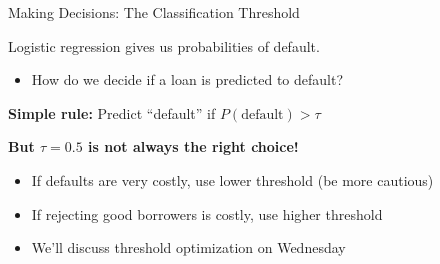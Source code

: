 \documentclass[10pt]{beamer}
\begin{document}
\begin{frame}{Making Decisions: The Classification Threshold}

Logistic regression gives us probabilities of default.
\begin{itemize}
    \item How do we decide if a loan is predicted to default?
\end{itemize}

  \vspace{0.5em}
  \textbf{Simple rule:} Predict ``default'' if $P(\text{default}) > \tau$

  \vspace{0.5em}
  \begin{center}
  \end{center}

  \vspace{0.5em}
  \textbf{But $\tau = 0.5$ is not always the right choice!}
  \begin{itemize}
    \item If defaults are very costly, use lower threshold (be more cautious)
    \item If rejecting good borrowers is costly, use higher threshold
    \item We'll discuss threshold optimization on Wednesday
  \end{itemize}
\end{frame}

\end{document}
